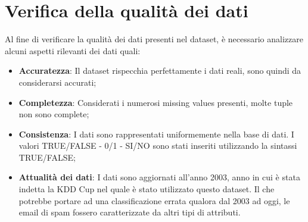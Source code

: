 \section{Verifica della qualità dei dati}
Al fine di verificare la qualità dei dati presenti nel dataset, è necessario analizzare alcuni aspetti rilevanti dei dati quali:
\begin{itemize}
	\item \textbf{Accuratezza}: Il dataset rispecchia perfettamente i dati reali, sono quindi da considerarsi accurati;
	\item \textbf{Completezza}: Considerati i numerosi missing values presenti, molte tuple non sono complete;
	\item \textbf{Consistenza}: I dati sono rappresentati uniformemente nella base di dati. I valori TRUE/FALSE - 0/1 - SI/NO sono stati inseriti utilizzando la sintassi TRUE/FALSE;
	\item \textbf{Attualità dei dati}: I dati sono aggiornati all'anno 2003, anno in cui è stata indetta la KDD Cup nel quale è stato utilizzato questo dataset. Il che potrebbe portare ad una classificazione errata qualora dal 2003 ad oggi, le email di spam fossero caratterizzate da altri tipi di attributi.
\end{itemize}
%
%
%
